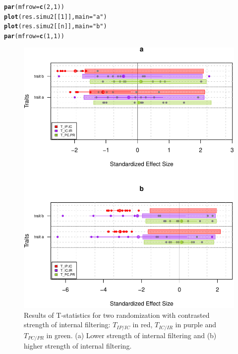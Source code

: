 \documentclass[12pt]{article}\usepackage[]{graphicx}\usepackage[]{color}
\makeatletter
\def\maxwidth{ %
  \ifdim\Gin@nat@width>\linewidth
    \linewidth
  \else
    \Gin@nat@width
  \fi
}
\newcommand{\hlnum}[1]{\textcolor[rgb]{0.686,0.059,0.569}{#1}}%
\newcommand{\hlstr}[1]{\textcolor[rgb]{0.192,0.494,0.8}{#1}}%
\newcommand{\hlstd}[1]{\textcolor[rgb]{0.345,0.345,0.345}{#1}}%
\newcommand{\hlkwc}[1]{\textcolor[rgb]{0.333,0.667,0.333}{#1}}%
\newcommand{\hlkwd}[1]{\textcolor[rgb]{0.737,0.353,0.396}{\textbf{#1}}}%
\newenvironment{kframe}{%
 \def\at@end@of@kframe{}%
 \ifinner\ifhmode%
  \def\at@end@of@kframe{\end{minipage}}%
  \begin{minipage}{\columnwidth}%
 \fi\fi%
 \def\FrameCommand##1{\hskip\@totalleftmargin \hskip-\fboxsep
 \colorbox{shadecolor}{##1}\hskip-\fboxsep
     \hskip-\linewidth \hskip-\@totalleftmargin \hskip\columnwidth}%
 \MakeFramed {\advance\hsize-\width
   \@totalleftmargin\z@ \linewidth\hsize
   \@setminipage}}%
 {\par\unskip\endMakeFramed%
 \at@end@of@kframe}
\newenvironment{knitrout}{}{} %
\makeatother
\begin{document}
\begin{knitrout}\small
{}\color{fgcolor}\begin{kframe}
\begin{alltt}
\hlkwd{par}\hlstd{(}\hlkwc{mfrow}\hlstd{=}\hlkwd{c}\hlstd{(}\hlnum{2}\hlstd{,} \hlnum{1}\hlstd{))}
\hlkwd{plot}\hlstd{(res.simu2[[}\hlnum{1}\hlstd{]],} \hlkwc{main}\hlstd{=}\hlstr{"a"}\hlstd{)}
\hlkwd{plot}\hlstd{(res.simu2[[n]],} \hlkwc{main}\hlstd{=}\hlstr{"b"}\hlstd{)}
\hlkwd{par}\hlstd{(}\hlkwc{mfrow}\hlstd{=}\hlkwd{c}\hlstd{(}\hlnum{1}\hlstd{,} \hlnum{1}\hlstd{))}
\end{alltt}
\end{kframe}\begin{figure}

{\centering \includegraphics[width=\maxwidth]{figure/typical_result_internal_filtering2-1} 

}

\caption[Results of T-statistics for two randomization with contrasted strength of internal filtering]{Results of T-statistics for two randomization with contrasted strength of internal filtering: $T_{IP/IC}$ in red, $T_{IC/IR}$ in purple and $T_{PC/PR}$ in green. (a) Lower strength of internal filtering and (b) higher strength of internal filtering.}\label{fig:typical_result_internal_filtering2}
\end{figure}


\end{knitrout}
\end{document}
